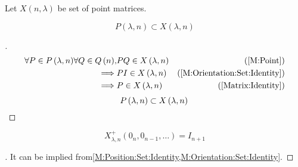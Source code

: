 \documentclass[../main.tex]{subfiles}
\begin{document}
\begin{definition}\label{M:Point:Set}
Let $X\left(n,\lambda\right)$ be set of point matrices.
\end{definition}
\begin{corollary}\label{M:Point:Position}
\begin{equation*}
P\left(\lambda,n\right)\subset X\left(\lambda,n\right)
\end{equation*}
\end{corollary}
\begin{proof}[]
\begin{align*}
\forall{P\in P\left(\lambda,n\right)}
\forall{Q\in Q\left(n\right)},
&P Q\in X\left(\lambda,n\right)
&\text{(\cref{M:Point})}\\
\implies
&P I\in X\left(\lambda,n\right)
&\text{(\cref{M:Orientation:Set:Identity})}\\
\implies
&P\in X\left(\lambda,n\right)
&\text{(\cref{Matrix:Identity})}
\end{align*}
\begin{equation*}
P\left(\lambda,n\right)\subset X\left(\lambda,n\right)\qedhere
\end{equation*}
\end{proof}
\begin{corollary}\label{M:Point:Set:Identity}
\begin{equation*}
X^{+}_{\lambda,n}
\left(0_{n}, 0_{n-1},\dots\right)
=
I_{n+1}
\end{equation*}
\end{corollary}
\begin{proof}[]
It can be implied from\cref{M:Position:Set:Identity,M:Orientation:Set:Identity}.
\end{proof}
\end{document}
